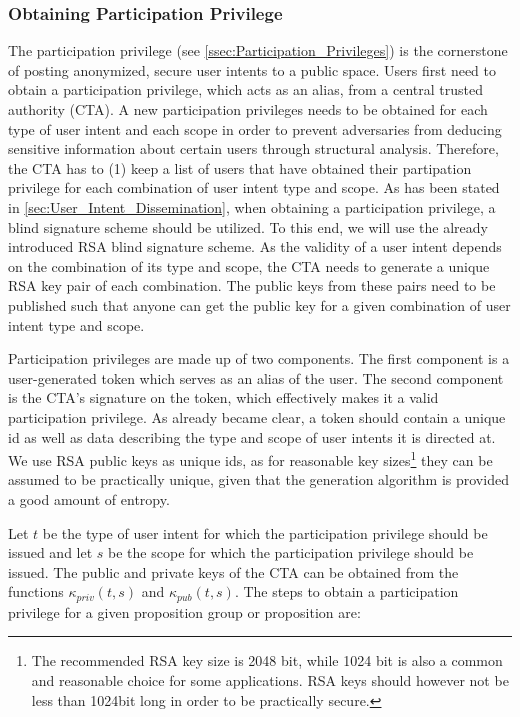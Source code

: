 \subsubsection{Obtaining Participation Privilege}
The participation privilege (see \autoref{ssec:Participation_Privileges}) is the cornerstone of posting anonymized, secure user intents to a public space.
Users first need to obtain a participation privilege, which acts as an alias, from a central trusted authority (CTA).
A new participation privileges needs to be obtained for each type of user intent and each scope in order to prevent adversaries from deducing sensitive information about certain users through structural analysis.
Therefore, the CTA has to (1) keep a list of users that have obtained their partipation privilege for each combination of user intent type and scope.
As has been stated in \autoref{sec:User_Intent_Dissemination}, when obtaining a participation privilege, a blind signature scheme should be utilized.
To this end, we will use the already introduced RSA blind signature scheme.
As the validity of a user intent depends on the combination of its type and scope, the CTA needs to generate a unique RSA key pair of each combination.
The public keys from these pairs need to be published such that anyone can get the public key for a given combination of user intent type and scope.

Participation privileges are made up of two components.
The first component is a user-generated token which serves as an alias of the user.
The second component is the CTA's signature on the token, which effectively makes it a valid participation privilege.
As already became clear, a token should contain a unique id as well as data describing the type and scope of user intents it is directed at.
We use RSA public keys as unique ids, as for reasonable key sizes\footnote{The recommended RSA key size is 2048 bit, while 1024 bit is also a common and reasonable choice for some applications. RSA keys should however not be less than 1024bit long in order to be practically secure.} they can be assumed to be practically unique, given that the generation algorithm is provided a good amount of entropy.


 
Let $t$ be the type of user intent for which the participation privilege should be issued and let $s$ be the scope for which the participation privilege should be issued.
The public and private keys of the CTA can be obtained from the functions $ \kappa_\textit{priv}(t,s)$ and $ \kappa_\textit{pub}(t,s)$.
The steps to obtain a participation privilege for a given proposition group or proposition are:


